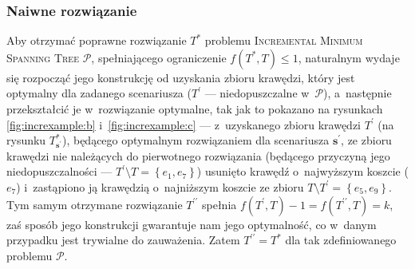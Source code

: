 \subsubsection{Naiwne rozwiązanie}


Aby otrzymać poprawne rozwiązanie $T^{\ast}$ problemu \textsc{Incremental Minimum Spanning Tree} $\mathcal{P}$, spełniającego ograniczenie $f \left( T^{\ast}, T \right) \leqslant 1$, naturalnym wydaje się rozpocząć jego konstrukcję od uzyskania zbioru krawędzi, który jest optymalny dla zadanego scenariusza ($T^{\prime}$ --- niedopuszczalne w~$\mathcal{P}$), a~następnie przekształcić je w~rozwiązanie optymalne, tak jak to pokazano na rysunkach \ref{fig:increxample:b} i~\ref{fig:increxample:c} --- z~uzyskanego zbioru krawędzi $T^{\prime}$ (na rysunku $T^{\ast}_{\textbf{s}^{\prime}}$), będącego optymalnym rozwiązaniem dla scenariusza $\textbf{s}^{\prime}$, ze zbioru krawędzi nie należących do pierwotnego rozwiązania (będącego przyczyną jego niedopuszczalności --- $T^{\prime} \setminus T = \left\{ e_{1}, e_{7} \right\}$) usunięto krawędź o~najwyższym koszcie ($e_{7}$) i~zastąpiono ją krawędzią o~najniższym koszcie ze zbioru $T \setminus T^{\prime} = \left\{ e_{5}, e_{9} \right\}$.
Tym samym otrzymane rozwiązanie $T^{\prime\prime}$ spełnia $f \left( T^{\prime}, T \right) - 1 = f \left( T^{\prime\prime}, T \right) = k$, zaś sposób jego konstrukcji gwarantuje nam jego optymalność, co w~danym przypadku jest trywialne do zauważenia.
Zatem $T^{\prime\prime} = T^{\ast}$ dla tak zdefiniowanego problemu $\mathcal{P}$.

